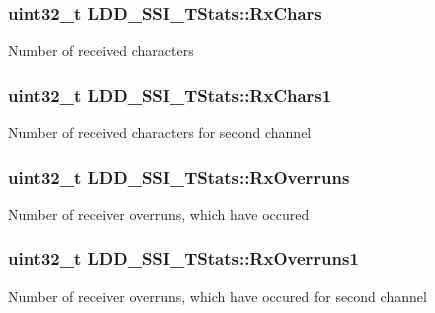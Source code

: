 \subsubsection[{Rx\+Chars}]{\setlength{\rightskip}{0pt plus 5cm}uint32\+\_\+t L\+D\+D\+\_\+\+S\+S\+I\+\_\+\+T\+Stats\+::\+Rx\+Chars}\label{struct_l_d_d___s_s_i___t_stats_ac77cdfd687b197b589fbcd43856aeb98}
Number of received characters \hypertarget{struct_l_d_d___s_s_i___t_stats_ae5221a07e2a6ad3907c34007693dbc55}{}
\subsubsection[{Rx\+Chars1}]{\setlength{\rightskip}{0pt plus 5cm}uint32\+\_\+t L\+D\+D\+\_\+\+S\+S\+I\+\_\+\+T\+Stats\+::\+Rx\+Chars1}\label{struct_l_d_d___s_s_i___t_stats_ae5221a07e2a6ad3907c34007693dbc55}
Number of received characters for second channel \hypertarget{struct_l_d_d___s_s_i___t_stats_aa2125ae18425d2e4bd193b1ee434c8d9}{}
\subsubsection[{Rx\+Overruns}]{\setlength{\rightskip}{0pt plus 5cm}uint32\+\_\+t L\+D\+D\+\_\+\+S\+S\+I\+\_\+\+T\+Stats\+::\+Rx\+Overruns}\label{struct_l_d_d___s_s_i___t_stats_aa2125ae18425d2e4bd193b1ee434c8d9}
Number of receiver overruns, which have occured \hypertarget{struct_l_d_d___s_s_i___t_stats_af0efb66c36bfe377efb18e6ab2fe4559}{}
\subsubsection[{Rx\+Overruns1}]{\setlength{\rightskip}{0pt plus 5cm}uint32\+\_\+t L\+D\+D\+\_\+\+S\+S\+I\+\_\+\+T\+Stats\+::\+Rx\+Overruns1}\label{struct_l_d_d___s_s_i___t_stats_af0efb66c36bfe377efb18e6ab2fe4559}
Number of receiver overruns, which have occured for second channel \hypertarget{struct_l_d_d___s_s_i___t_stats_abaff1182d41c2c211ce8da947df77bbd}{}
